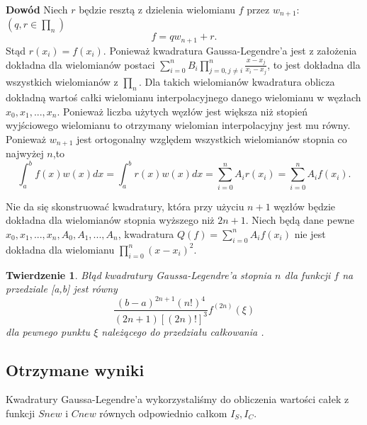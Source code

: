 \documentclass{article}
\newtheorem{theorem}{Twierdzenie}
\begin{document}
\textbf{Dowód} Niech $r$ będzie resztą z dzielenia wielomianu $f$ przez $w_{n+1}$: $(q,r\in \prod_{n})$\[f = qw_{n+1} + r .\] Stąd $r(x_i) = f(x_i)$. Ponieważ kwadratura Gaussa-Legendre'a jest z założenia dokładna dla wielomianów postaci $\sum_{i=0}^n B_i\prod_{j=0,j\neq i}^n \frac{x-x_j}{x_i-x_j}$, to jest dokładna dla wszystkich wielomianów z $\prod_n$. Dla takich wielomianów kwadratura oblicza dokładną wartoś całki wielomianu interpolacyjnego danego wielomianu w węzłach $x_0,x_1,...,x_n$. Ponieważ liczba użytych węzłów jest większa niż stopień wyjściowego wielomianu to otrzymany wielomian interpolacyjny jest mu równy. Ponieważ $w_{n+1}$ jest ortogonalny względem wszystkich wielomianów stopnia co najwyżej $n$,to \[\int_a^b f(x)w(x)dx = \int_a^b r(x)w(x)dx = \sum_{i=0}^n A_ir(x_i) = \sum_{i=0}^n A_if(x_i).\] 

Nie da się skonstruować kwadratury, która przy użyciu $n+1$ węzłów będzie dokładna dla wielomianów stopnia wyższego niż $2n+1$. Niech będą dane pewne $x_0,x_1,...,x_n,A_0,A_1,...,A_n$, kwadratura $Q(f) = \sum_{i=0}^n A_if(x_i)$ nie jest dokładna dla wielomianu $\prod_{i=0}^n (x-x_i)^2$. \newline

\begin{theorem}
	Błąd kwadratury Gaussa-Legendre'a stopnia $n$ dla funkcji $f$ na przedziale [a,b] jest równy \[
		\frac{(b-a)^{2n+1}(n!)^4}{(2n+1)[(2n)!]^3}f^{(2n)}(\xi) \]
dla pewnego punktu $\xi$ należącego do przedziału całkowania \cite{khaner}.
\end{theorem}

\subsection{Otrzymane wyniki}
	Kwadratury Gaussa-Legendre'a wykorzystaliśmy do obliczenia wartości całek z funkcji $Snew$ i $Cnew$ równych odpowiednio całkom $I_S,I_C$.
\end{document}
